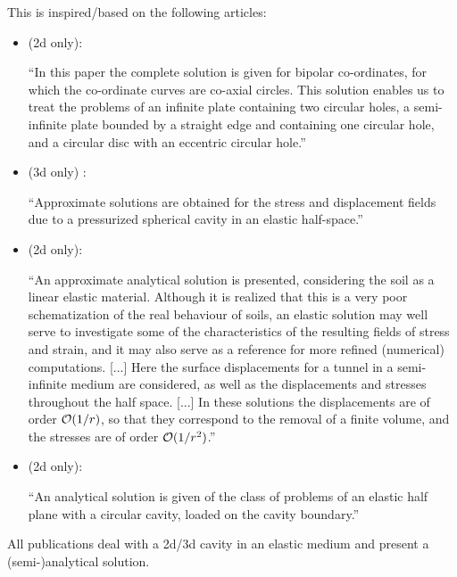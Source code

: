 This \stone is inspired/based on the following articles:
\begin{itemize}
\item {} (2d only):

\begin{displayquote}
``In this paper the complete solution is given for bipolar co-ordinates, for which the
co-ordinate curves are co-axial circles. This solution enables us to treat the problems
of an infinite plate containing two circular holes, a semi-infinite plate bounded by a
straight edge and containing one circular hole, and a circular disc with an eccentric
circular hole.''
\end{displayquote}
 
\item {} (3d only) :
\begin{displayquote}
``Approximate solutions are obtained for the stress and displacement fields due to a 
pressurized spherical cavity in an elastic half-space.''
\end{displayquote}


\item {} (2d only):
\begin{displayquote}
``An approximate analytical solution is presented,
considering the soil as a linear elastic material.
Although it is realized that this is a very poor
schematization of the real behaviour of soils, an
elastic solution may well serve to investigate some
of the characteristics of the resulting fields of stress
and strain, and it may also serve as a reference for
more refined (numerical) computations.
[...]
Here the surface displacements for a
tunnel in a semi-infinite medium are considered, as
well as the displacements and stresses throughout
the half space.
[...]
In these solutions the displacements are of order ${\cal O}(1/r)$, so that they correspond
to the removal of a finite volume, and the stresses are of order ${\cal O}(1/r^2)$.''
\end{displayquote}

\item {} (2d only):
\begin{displayquote}
``An analytical solution is given of the class of problems of an elastic half plane with a
circular cavity, loaded on the cavity boundary.''
\end{displayquote}


\end{itemize}
All publications deal with a 2d/3d cavity in an elastic medium and present 
a (semi-)analytical solution.

